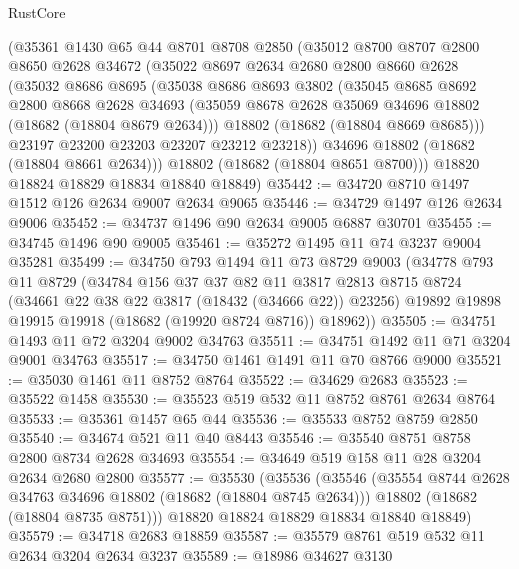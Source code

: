 \begin{lexlean}{RustCore}
\begin{coremodule}
    (@35361
      @1430
      @65
      @44
      @8701
      @8708
      @2850
      (@35012
        @8700
        @8707
        @2800
        @8650
        @2628
        @34672
        (@35022
          @8697
          @2634
          @2680
          @2800
          @8660
          @2628
          (@35032
            @8686
            @8695
            (@35038
              @8686
              @8693
              @3802
              (@35045
                @8685
                @8692
                @2800
                @8668
                @2628
                @34693
                (@35059 @8678 @2628 @35069 @34696 @18802 (@18682 (@18804 @8679 @2634)))
                @18802
                (@18682 (@18804 @8669 @8685)))
              @23197
              @23200
              @23203
              @23207
              @23212
              @23218))
          @34696
          @18802
          (@18682 (@18804 @8661 @2634)))
        @18802
        (@18682 (@18804 @8651 @8700)))
      @18820
      @18824
      @18829
      @18834
      @18840
      @18849)
@35442 := @34720 @8710 @1497 @1512 @126 @2634 @9007 @2634 @9065
@35446 := @34729 @1497 @126 @2634 @9006
@35452 := @34737 @1496 @90 @2634 @9005 @6887 @30701
@35455 := @34745 @1496 @90 @9005
@35461 := @35272 @1495 @11 @74 @3237 @9004 @35281
@35499 := @34750
    @793
    @1494
    @11
    @73
    @8729
    @9003
    (@34778
      @793
      @11
      @8729
      (@34784
        @156
        @37
        @37
        @82
        @11
        @3817
        @2813
        @8715
        @8724
        (@34661 @22 @38 @22 @3817 (@18432 (@34666 @22)) @23256)
        @19892
        @19898
        @19915
        @19918
        (@18682 (@19920 @8724 @8716))
        @18962))
@35505 := @34751 @1493 @11 @72 @3204 @9002 @34763
@35511 := @34751 @1492 @11 @71 @3204 @9001 @34763
@35517 := @34750 @1461 @1491 @11 @70 @8766 @9000
@35521 := @35030 @1461 @11 @8752 @8764
@35522 := @34629 @2683
@35523 := @35522 @1458
@35530 := @35523 @519 @532 @11 @8752 @8761 @2634 @8764
@35533 := @35361 @1457 @65 @44
@35536 := @35533 @8752 @8759 @2850
@35540 := @34674 @521 @11 @40 @8443
@35546 := @35540 @8751 @8758 @2800 @8734 @2628 @34693
@35554 := @34649 @519 @158 @11 @28 @3204 @2634 @2680 @2800
@35577 := @35530
    (@35536
      (@35546
        (@35554 @8744 @2628 @34763 @34696 @18802 (@18682 (@18804 @8745 @2634)))
        @18802
        (@18682 (@18804 @8735 @8751)))
      @18820
      @18824
      @18829
      @18834
      @18840
      @18849)
@35579 := @34718 @2683 @18859
@35587 := @35579 @8761 @519 @532 @11 @2634 @3204 @2634 @3237
@35589 := @18986 @34627 @3130

\end{coremodule}
\end{lexlean}
